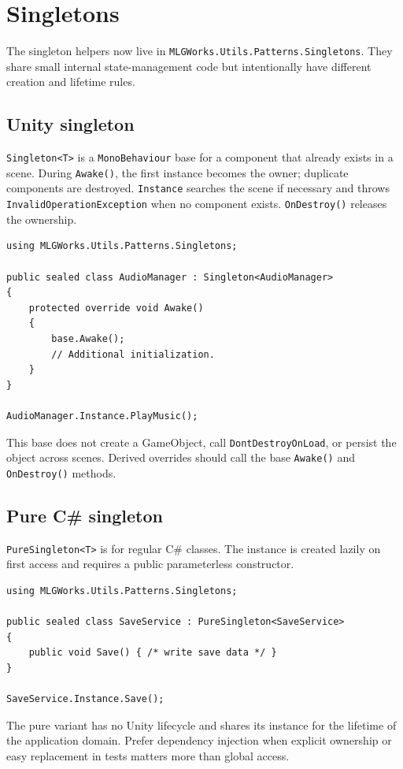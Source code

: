 \section{Singletons}
\label{sec:singletons}

The singleton helpers now live in \texttt{MLGWorks.Utils.Patterns.Singletons}. They share small internal state-management code but intentionally have different creation and lifetime rules.

\subsection{Unity singleton}
\texttt{Singleton<T>} is a \texttt{MonoBehaviour} base for a component that already exists in a scene. During \texttt{Awake()}, the first instance becomes the owner; duplicate components are destroyed. \texttt{Instance} searches the scene if necessary and throws \texttt{InvalidOperationException} when no component exists. \texttt{OnDestroy()} releases the ownership.

\begin{lstlisting}
using MLGWorks.Utils.Patterns.Singletons;

public sealed class AudioManager : Singleton<AudioManager>
{
    protected override void Awake()
    {
        base.Awake();
        // Additional initialization.
    }
}

AudioManager.Instance.PlayMusic();
\end{lstlisting}

This base does not create a GameObject, call \texttt{DontDestroyOnLoad}, or persist the object across scenes. Derived overrides should call the base \texttt{Awake()} and \texttt{OnDestroy()} methods.

\subsection{Pure C\# singleton}
\texttt{PureSingleton<T>} is for regular C\# classes. The instance is created lazily on first access and requires a public parameterless constructor.

\begin{lstlisting}
using MLGWorks.Utils.Patterns.Singletons;

public sealed class SaveService : PureSingleton<SaveService>
{
    public void Save() { /* write save data */ }
}

SaveService.Instance.Save();
\end{lstlisting}

The pure variant has no Unity lifecycle and shares its instance for the lifetime of the application domain. Prefer dependency injection when explicit ownership or easy replacement in tests matters more than global access.
